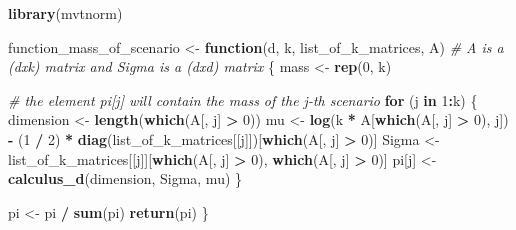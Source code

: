 \documentclass[
]{article}
\newenvironment{Shaded}{\begin{snugshade}}{\end{snugshade}}
\newcommand{\CommentTok}[1]{\textcolor[rgb]{0.56,0.35,0.01}{\textit{#1}}}
\newcommand{\ControlFlowTok}[1]{\textcolor[rgb]{0.13,0.29,0.53}{\textbf{#1}}}
\newcommand{\DecValTok}[1]{\textcolor[rgb]{0.00,0.00,0.81}{#1}}
\newcommand{\FunctionTok}[1]{\textcolor[rgb]{0.13,0.29,0.53}{\textbf{#1}}}
\newcommand{\NormalTok}[1]{#1}
\newcommand{\OtherTok}[1]{\textcolor[rgb]{0.56,0.35,0.01}{#1}}
\newcommand{\SpecialCharTok}[1]{\textcolor[rgb]{0.81,0.36,0.00}{\textbf{#1}}}
\begin{document}
\begin{Shaded}
\begin{Highlighting}[]
\FunctionTok{library}\NormalTok{(mvtnorm)}

\NormalTok{function\_mass\_of\_scenario }\OtherTok{\textless{}{-}} \ControlFlowTok{function}\NormalTok{(d, k, list\_of\_k\_matrices, A) }\CommentTok{\# A is a (dxk) matrix and Sigma is a (dxd) matrix}
\NormalTok{\{}
\NormalTok{  mass }\OtherTok{\textless{}{-}} \FunctionTok{rep}\NormalTok{(}\DecValTok{0}\NormalTok{, k)}

  \CommentTok{\# the element pi[j] will contain the mass of the j{-}th scenario}
  \ControlFlowTok{for}\NormalTok{ (j }\ControlFlowTok{in} \DecValTok{1}\SpecialCharTok{:}\NormalTok{k) \{}
\NormalTok{    dimension }\OtherTok{\textless{}{-}} \FunctionTok{length}\NormalTok{(}\FunctionTok{which}\NormalTok{(A[, j] }\SpecialCharTok{\textgreater{}} \DecValTok{0}\NormalTok{))}
\NormalTok{    mu }\OtherTok{\textless{}{-}} \FunctionTok{log}\NormalTok{(k }\SpecialCharTok{*}\NormalTok{ A[}\FunctionTok{which}\NormalTok{(A[, j] }\SpecialCharTok{\textgreater{}} \DecValTok{0}\NormalTok{), j]) }\SpecialCharTok{{-}}\NormalTok{ (}\DecValTok{1} \SpecialCharTok{/} \DecValTok{2}\NormalTok{) }\SpecialCharTok{*} \FunctionTok{diag}\NormalTok{(list\_of\_k\_matrices[[j]])[}\FunctionTok{which}\NormalTok{(A[, j] }\SpecialCharTok{\textgreater{}} \DecValTok{0}\NormalTok{)]}
\NormalTok{    Sigma }\OtherTok{\textless{}{-}}\NormalTok{ list\_of\_k\_matrices[[j]][}\FunctionTok{which}\NormalTok{(A[, j] }\SpecialCharTok{\textgreater{}} \DecValTok{0}\NormalTok{), }\FunctionTok{which}\NormalTok{(A[, j] }\SpecialCharTok{\textgreater{}} \DecValTok{0}\NormalTok{)]}
\NormalTok{    pi[j] }\OtherTok{\textless{}{-}} \FunctionTok{calculus\_d}\NormalTok{(dimension, Sigma, mu)}
\NormalTok{  \}}



\NormalTok{  pi }\OtherTok{\textless{}{-}}\NormalTok{ pi }\SpecialCharTok{/} \FunctionTok{sum}\NormalTok{(pi)}
  \FunctionTok{return}\NormalTok{(pi)}
\NormalTok{\}}
\end{Highlighting}
\end{Shaded}
\end{document}
